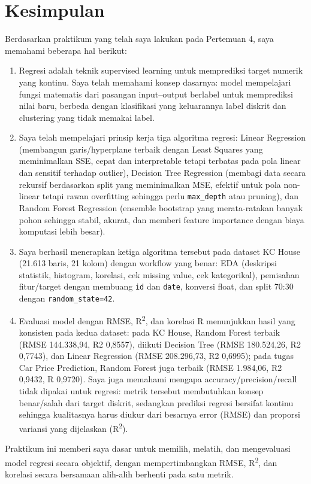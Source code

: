 \documentclass[a4paper,oneside,12pt]{report}
\begin{document}
\chapter{Kesimpulan}
Berdasarkan praktikum yang telah saya lakukan pada Pertemuan 4, saya memahami beberapa hal berikut:
\begin{enumerate}
    \item Regresi adalah teknik supervised learning untuk memprediksi target numerik yang kontinu. Saya telah memahami konsep dasarnya: model mempelajari fungsi matematis dari pasangan input--output berlabel untuk memprediksi nilai baru, berbeda dengan klasifikasi yang keluarannya label diskrit dan clustering yang tidak memakai label.
    \item Saya telah mempelajari prinsip kerja tiga algoritma regresi: Linear Regression (membangun garis/hyperplane terbaik dengan Least Squares yang meminimalkan SSE, cepat dan interpretable tetapi terbatas pada pola linear dan sensitif terhadap outlier), Decision Tree Regression (membagi data secara rekursif berdasarkan split yang meminimalkan MSE, efektif untuk pola non-linear tetapi rawan overfitting sehingga perlu \texttt{max\_depth} atau pruning), dan Random Forest Regression (ensemble bootstrap yang merata-ratakan banyak pohon sehingga stabil, akurat, dan memberi feature importance dengan biaya komputasi lebih besar).
    \item Saya berhasil menerapkan ketiga algoritma tersebut pada dataset KC House (21.613 baris, 21 kolom) dengan workflow yang benar: EDA (deskripsi statistik, histogram, korelasi, cek missing value, cek kategorikal), pemisahan fitur/target dengan membuang \texttt{id} dan \texttt{date}, konversi float, dan split 70:30 dengan \texttt{random\_state=42}.
    \item Evaluasi model dengan RMSE, R\textsuperscript{2}, dan korelasi R menunjukkan hasil yang konsisten pada kedua dataset: pada KC House, Random Forest terbaik (RMSE 144.338,94, R2 0,8557), diikuti Decision Tree (RMSE 180.524,26, R2 0,7743), dan Linear Regression (RMSE 208.296,73, R2 0,6995); pada tugas Car Price Prediction, Random Forest juga terbaik (RMSE 1.984,06, R2 0,9432, R 0,9720). Saya juga memahami mengapa accuracy/precision/recall tidak dipakai untuk regresi: metrik tersebut membutuhkan konsep benar/salah dari target diskrit, sedangkan prediksi regresi bersifat kontinu sehingga kualitasnya harus diukur dari besarnya error (RMSE) dan proporsi variansi yang dijelaskan (R\textsuperscript{2}).
\end{enumerate}
Praktikum ini memberi saya dasar untuk memilih, melatih, dan mengevaluasi model regresi secara objektif, dengan mempertimbangkan RMSE, R\textsuperscript{2}, dan korelasi secara bersamaan alih-alih berhenti pada satu metrik.
\end{document}
